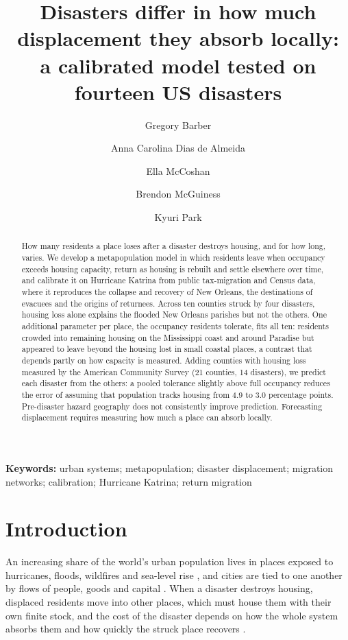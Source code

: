 \documentclass[11pt]{article}
\title{Disasters differ in how much displacement they absorb locally:\\ a calibrated model tested on fourteen US disasters}
\author[1]{Gregory Barber}
\author[1]{Anna Carolina Dias de Almeida}
\author[1]{Ella McCoshan}
\author[1]{Brendon McGuiness}
\author[2]{Kyuri Park}
\affil[1]{[affiliation]}
\affil[2]{Computational Science Lab, Informatics Institute, University of Amsterdam, The Netherlands}
\date{}
\begin{document}
\maketitle

\begin{abstract}
How many residents a place loses after a disaster destroys housing, and for how long, varies. We develop a metapopulation model in which residents leave when occupancy exceeds housing capacity, return as housing is rebuilt and settle elsewhere over time, and calibrate it on Hurricane Katrina from public tax-migration and Census data, where it reproduces the collapse and recovery of New Orleans, the destinations of evacuees and the origins of returnees. Across ten counties struck by four disasters, housing loss alone explains the flooded New Orleans parishes but not the others. One additional parameter per place, the occupancy residents tolerate, fits all ten: residents crowded into remaining housing on the Mississippi coast and around Paradise but appeared to leave beyond the housing lost in small coastal places, a contrast that depends partly on how capacity is measured. Adding counties with housing loss measured by the American Community Survey (21 counties, 14 disasters), we predict each disaster from the others: a pooled tolerance slightly above full occupancy reduces the error of assuming that population tracks housing from 4.9 to 3.0 percentage points. Pre-disaster hazard geography does not consistently improve prediction. Forecasting displacement requires measuring how much a place can absorb locally.
\end{abstract}

\noindent\textbf{Keywords:} urban systems; metapopulation; disaster displacement; migration networks; calibration; Hurricane Katrina; return migration

\section{Introduction}

An increasing share of the world's urban population lives in places exposed to hurricanes, floods, wildfires and sea-level rise \citep{Seto2010,Magnan2023}, and cities are tied to one another by flows of people, goods and capital \citep{Seto2012,Espey2024}. When a disaster destroys housing, displaced residents move into other places, which must house them with their own finite stock, and the cost of the disaster depends on how the whole system absorbs them and how quickly the struck place recovers \citep{Levine2007,Peacock2014}.
\end{document}
